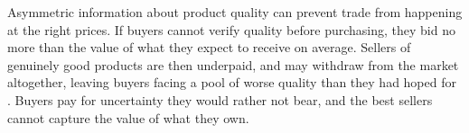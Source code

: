 Asymmetric information about product quality can prevent trade from happening at the right
prices. If buyers cannot verify quality before purchasing, they bid no more than the value of
what they expect to receive on average. Sellers of genuinely good products are then underpaid,
and may withdraw from the market altogether, leaving buyers facing a pool of worse quality than
they had hoped for \citep{akerlof_lemons_1970}. Buyers pay for
uncertainty they would rather not bear, and the best sellers cannot capture the value of what
they own.
